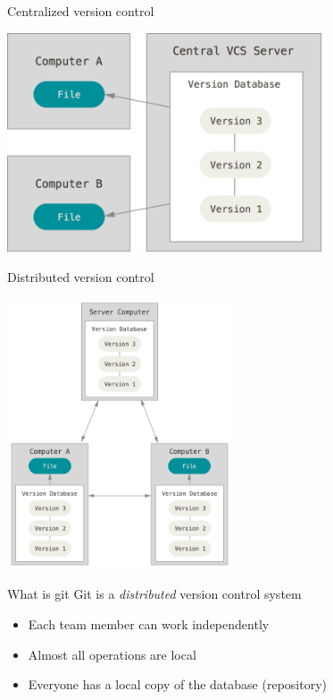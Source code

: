 \documentclass[
  11pt,
  american,
  ignorenonframetext,
  aspectratio=43,
  compress,
  xcolor=dvipsnames]{beamer}
\providecommand{\tightlist}{%
  \setlength{\itemsep}{0pt}\setlength{\parskip}{0pt}}
\begin{document}
\begin{frame}{Centralized version control}
\protect\hypertarget{centralized-version-control}{}
\begin{center}
\includegraphics[width=0.7\textwidth]{./images/centralized.png}
\end{center}
\end{frame}

\begin{frame}{Distributed version control}
\protect\hypertarget{distributed-version-control}{}
\begin{center}
\includegraphics[width=0.5\textwidth]{./images/distributed.png}
\end{center}
\end{frame}

\begin{frame}{What is git}
\protect\hypertarget{what-is-git}{}
Git is a \emph{distributed} version control system

\begin{itemize}
\tightlist
\item
  Each team member can work independently
\item
  Almost all operations are local
\item
  Everyone has a local copy of the database (repository)
\end{itemize}
\end{frame}
\end{document}
